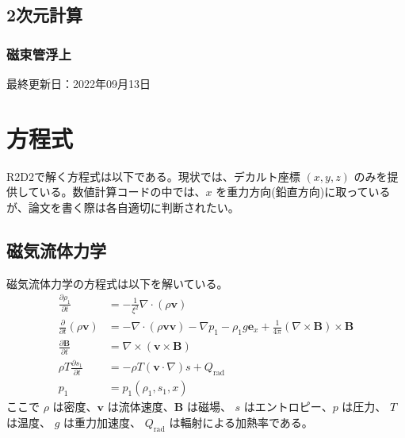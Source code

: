 \documentclass[letterpaper,10pt,dvipdfmx,report]{sphinxmanual}
\begin{document}
\section{2次元計算}
\label{\detokenize{typical_case:id13}}

\subsection{磁束管浮上}
\label{\detokenize{typical_case:id14}}
\sphinxAtStartPar
最終更新日：2022年09月13日

\sphinxstepscope


\chapter{方程式}
\label{\detokenize{equation:id1}}\label{\detokenize{equation::doc}}
\sphinxAtStartPar
R2D2で解く方程式は以下である。現状では、デカルト座標 \((x,y,z)\)  のみを提供している。数値計算コードの中では、\(x\) を重力方向(鉛直方向)に取っているが、論文を書く際は各自適切に判断されたい。


\section{磁気流体力学}
\label{\detokenize{equation:id2}}
\sphinxAtStartPar
磁気流体力学の方程式は以下を解いている。
\begin{equation*}
\begin{split}\frac{\partial \rho_1}{\partial t} &= - \frac{1}{\xi^2}\nabla\cdot
\left(\rho \boldsymbol{v}\right) \\
\frac{\partial}{\partial t}\left(\rho \boldsymbol{v}\right) &=
-\nabla\cdot\left(\rho\boldsymbol{vv}\right)
- \nabla p_1 - \rho_1 g\boldsymbol{e}_x
+\frac{1}{4\pi}\left(\nabla\times\boldsymbol{B}\right)
\times\boldsymbol{B} \\
\frac{\partial \boldsymbol{B}}{\partial t} &=
\nabla\times\left(\boldsymbol{v\times B}\right)
\\
\rho T \frac{\partial s_1}{\partial t} &= -\rho T
\left(\boldsymbol{v}\cdot\nabla\right) s + Q_\mathrm{rad} \\
p_1 &= p_1(\rho_1,s_1,x)\end{split}
\end{equation*}
\sphinxAtStartPar
ここで \(\rho\) は密度、\(\boldsymbol{v}\) は流体速度、\(\boldsymbol{B}\) は磁場、 \(s\) はエントロピー、\(p\) は圧力、 \(T\) は温度、 \(g\) は重力加速度、 \(Q_\mathrm{rad}\) は輻射による加熱率である。
\end{document}
